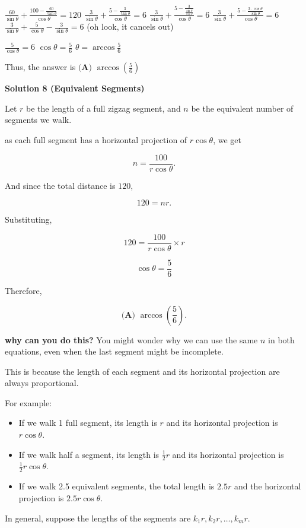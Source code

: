 \begin{enumerate}
 $\frac{60}{\sin{\theta}} + \frac{100 - \frac{60}{\tan{\theta}}}{\cos{\theta}} = 120$
$\frac{3}{\sin{\theta}} + \frac{5 - \frac{3}{\tan{\theta}}}{\cos{\theta}} = 6$
$\frac{3}{\sin{\theta}} + \frac{5 - \frac{3}{\frac{\sin{\theta}}{\cos{\theta}}}}{\cos{\theta}} = 6$
$\frac{3}{\sin{\theta}} + \frac{5 - \frac{3\cdot\cos{\theta}}{\sin{\theta}}}{\cos{\theta}} = 6$
$\frac{3}{\sin{\theta}} + \frac{5}{\cos{\theta}} - \frac{3}{\sin{\theta}} = 6$ (oh look, it cancels out)

 $\frac{5}{\cos{\theta}} = 6$
$\cos{\theta} = \frac{5}{6}$
$\theta = \arccos{\frac{5}{6}}$

 Thus, the answer is $\boxed{\textbf{(A) } \arccos\left(\frac{5}{6}\right)}$




\textbf{Solution 8 (Equivalent Segments)}

Let $r$ be the length of a full zigzag segment, and $n$ be the equivalent number of segments we walk.

 as each full segment has a horizontal projection of $r\cos\theta$, we get

 
 \[n=\frac{100}{r\cos\theta}.\]

 And since the total distance is $120$,

 
 \[120=nr.\]

 Substituting,

 
 \[120=\frac{100}{r\cos\theta}\times r\]

 \[\cos\theta=\frac56\]

 Therefore,

 
 \[\boxed{\textbf{(A) }\arccos\left(\frac56\right)}.\]

 \textbf{why can you do this?} You might wonder why we can use the same $n$ in both equations, even when the last segment might be incomplete.

 This is because the length of each segment and its horizontal projection are always proportional.

 For example:

 
            \begin{itemize}
        \item If we walk 1 full segment, its length is $r$ and its horizontal projection is $r\cos\theta$.
        \item If we walk half a segment, its length is $\frac12r$ and its horizontal projection is $\frac12r\cos\theta$.
        \item If we walk 2.5 equivalent segments, the total length is $2.5r$ and the horizontal projection is $2.5r\cos\theta$.
            \end{itemize}
            In general, suppose the lengths of the segments are $k_1r,k_2r,\ldots,k_mr$.


\end{enumerate}
